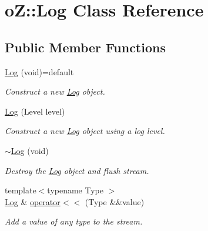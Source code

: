 \hypertarget{classo_z_1_1_log}{}\section{oZ\+::Log Class Reference}
\label{classo_z_1_1_log}
\subsection*{Public Member Functions}
\begin{DoxyCompactItemize}
\item 
\mbox{\label{classo_z_1_1_log_afc1467edb15b611bbb42630e1acaee12}} 
\mbox{\hyperlink{classo_z_1_1_log_afc1467edb15b611bbb42630e1acaee12}{Log}} (void)=default
\begin{DoxyCompactList}\small\item\em Construct a new \mbox{\hyperlink{classo_z_1_1_log}{Log}} object. \end{DoxyCompactList}\item 
\mbox{\label{classo_z_1_1_log_ad3902d7978a48f2c02174bd048acec17}} 
\mbox{\hyperlink{classo_z_1_1_log_ad3902d7978a48f2c02174bd048acec17}{Log}} (Level level)
\begin{DoxyCompactList}\small\item\em Construct a new \mbox{\hyperlink{classo_z_1_1_log}{Log}} object using a log level. \end{DoxyCompactList}\item 
\mbox{\label{classo_z_1_1_log_a28d6db7c25427e63d38eebfc05290b52}} 
\mbox{\hyperlink{classo_z_1_1_log_a28d6db7c25427e63d38eebfc05290b52}{$\sim$\+Log}} (void)
\begin{DoxyCompactList}\small\item\em Destroy the \mbox{\hyperlink{classo_z_1_1_log}{Log}} object and flush stream. \end{DoxyCompactList}\item 
\mbox{\label{classo_z_1_1_log_a0cb4c3c614b1d5ae6285aecb31554fb4}} 
{\footnotesize template$<$typename Type $>$ }\\\mbox{\hyperlink{classo_z_1_1_log}{Log}} \& \mbox{\hyperlink{classo_z_1_1_log_a0cb4c3c614b1d5ae6285aecb31554fb4}{operator$<$$<$}} (Type \&\&value)
\begin{DoxyCompactList}\small\item\em Add a value of any type to the stream. \end{DoxyCompactList}\item 

\end{DoxyCompactItemize}
